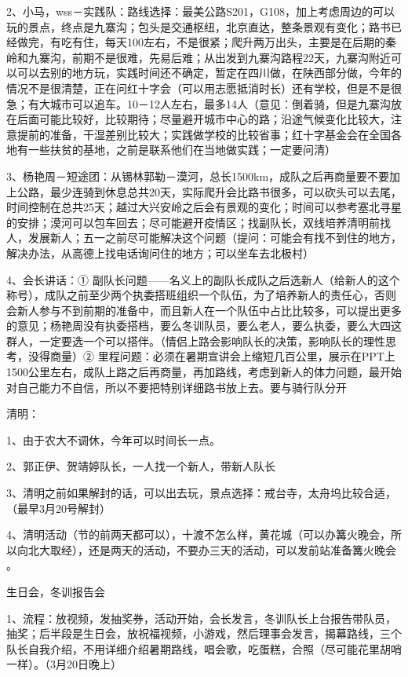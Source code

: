 \documentclass{ctexbook}
\begin{document}
2、小马，wss－实践队：路线选择：最美公路S201，G108，加上考虑周边的可以玩的景点，终点是九寨沟；包头是交通枢纽，北京直达，整条景观有变化；路书已经做完，有吃有住，每天100左右，不是很紧；爬升两万出头，主要是在后期的秦岭和九寨沟，前期不是很难，先易后难；从出发到九寨沟路程22天，九寨沟附近可以可以去别的地方玩，实践时间还不确定，暂定在四川做，在陕西部分做，今年的情况不是很清楚，正在问红十字会（可以用志愿抵消时长）还有学校，但是不是很急；有大城市可以追车。10－12人左右，最多14人（意见：倒着骑，但是九寨沟放在后面可能比较好，比较期待；尽量避开城市中心的路；沿途气候变化比较大，注意提前的准备，干湿差别比较大；实践做学校的比较省事；红十字基金会在全国各地有一些扶贫的基地，之前是联系他们在当地做实践；一定要问清）

3、杨艳周－短途团：从锡林郭勒－漠河，总长1500km，成队之后再商量要不要加上公路，最少连骑到休息总共20天，实际爬升会比路书很多，可以砍头可以去尾，时间控制在总共25天；越过大兴安岭之后会有景观的变化；时间可以参考塞北寻星的安排；漠河可以包车回去；尽可能避开疫情区；找副队长，双线培养清明前找人，发展新人；五一之前尽可能解决这个问题（提问：可能会有找不到住的地方，解决办法，从高德上找电话询问住的地方；可以坐车去北极村）

4、会长讲话：① 副队长问题——名义上的副队长成队之后选新人（给新人的这个称号），成队之前至少两个执委搭班组织一个队伍，为了培养新人的责任心，否则会新人参与不到前期的准备中，而且新人在一个队伍中占比比较多，可以提出更多的意见；杨艳周没有执委搭档，要么冬训队员，要么老人，要么执委，要么大四这群人，一定要选一个可以搭伴。（情侣上路会影响队长的决策，影响队长的理性思考，没得商量）② 里程问题：必须在暑期宣讲会上缩短几百公里，展示在PPT上1500公里左右，成队上路之后再商量，再加路线，考虑到新人的体力问题，最开始对自己能力不自信，所以不要把特别详细路书放上去。要与骑行队分开

清明：

1、由于农大不调休，今年可以时间长一点。

2、郭正伊、贺靖婷队长，一人找一个新人，带新人队长

3、清明之前如果解封的话，可以出去玩，景点选择：戒台寺，太舟坞比较合适，（最早3月20号解封）

4、清明活动（节的前两天都可以），十渡不怎么样，黄花城（可以办篝火晚会，所以向北大取经），还是两天的活动，不要办三天的活动，可以发前站准备篝火晚会 。

生日会，冬训报告会

1、流程：放视频，发抽奖券，活动开始，会长发言，冬训队长上台报告带队员，抽奖；后半段是生日会，放祝福视频，小游戏，然后理事会发言，揭幕路线，三个队长自我介绍，不用详细介绍暑期路线，唱会歌，吃蛋糕，合照（尽可能花里胡哨一样）。（3月20日晚上）
\end{document}
